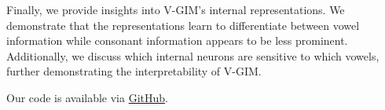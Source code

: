 Finally, we provide insights into V-GIM's internal representations. We demonstrate that the representations learn to differentiate between vowel information while consonant information appears to be less prominent. Additionally, we discuss which internal neurons are sensitive to which vowels, further demonstrating the interpretability of V-GIM.

Our code is available via \href{https://github.com/oBoii/Variational-Greedy-InfoMax}{GitHub}.
 





 














